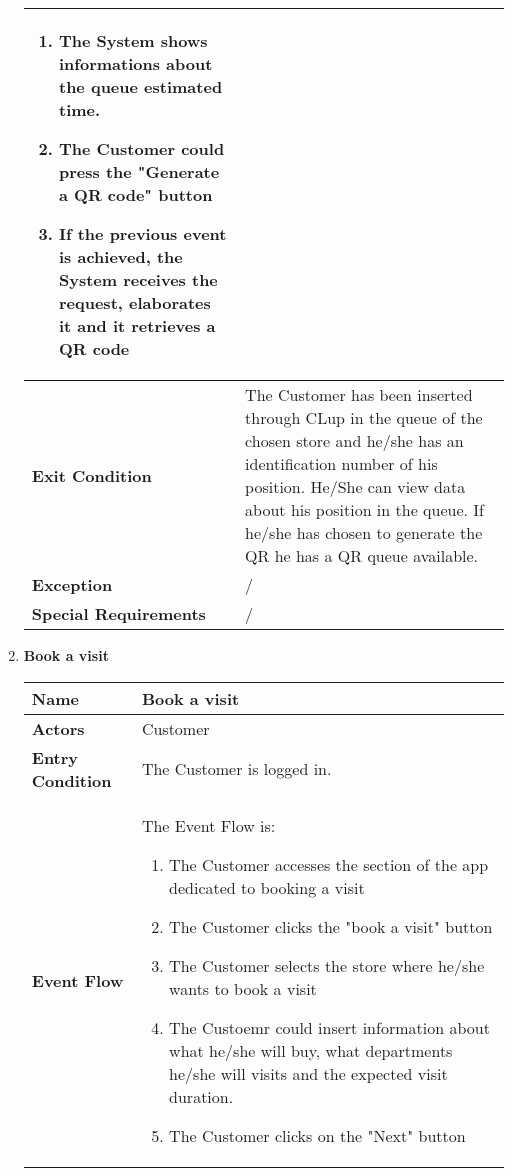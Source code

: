 \begin{enumerate}
{\begin{longtable}{|L{4cm}|L{10cm}|}
\begin{enumerate}
                        \item The System shows informations about the queue estimated time.
                        \item The Customer could press the "Generate a QR code" button
                        \item If the previous event is achieved, the System receives the request, elaborates it and it retrieves a QR code
                    \end{enumerate} \\
                \hline
                \textbf{Exit Condition} & The Customer has been inserted through CLup in the queue of the chosen store and he/she has an identification number of his position. He/She can view data about his position in the queue. If he/she has chosen to generate the QR he has a QR queue available. \\
                \hline
                \textbf{Exception} & / \\
                \hline
                \textbf{Special Requirements} & / \\
                \hline
            \end{longtable}}
            \item \textbf{Book a visit}{\renewcommand{\arraystretch}{2}
            \begin{longtable}{|L{4cm}|L{10cm}|}
                \hline
                \textbf{Name} & Book a visit \\
                \hline
                \textbf{Actors} & Customer \\
                \hline
                \textbf{Entry Condition} & The Customer is logged in. \\
                \hline
                \textbf{Event Flow} & The Event Flow is: \begin{enumerate}
                        \item The Customer accesses the section of the app dedicated to booking a visit
                        \item The Customer clicks the "book a visit" button
                        \item The Customer selects the store where he/she wants to book a visit
                        \item The Custoemr could insert information about what he/she will buy, what departments he/she will visits and the expected visit duration.
                        \item The Customer clicks on the "Next" button

\end{enumerate}
\end{longtable}}
\end{enumerate}
